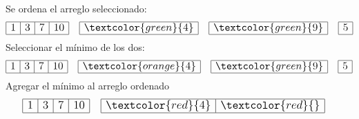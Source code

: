 \documentclass{article}
\begin{document}
\begin{minipage}{0.5\textwidth}
  Se ordena el arreglo seleccionado:
  \begin{equation*}
    \large
    \begin{array}{|r|r|r|r|}
      \hline 1 & 3 & 7 & 10 \\ \hline
    \end{array}\quad 
    \begin{array}{|r|}
      \hline \textcolor{green}{4} \\ \hline
    \end{array} \quad
    \begin{array}{|r|}
      \hline \textcolor{green}{9} \\ \hline
    \end{array}\quad 
    \begin{array}{|r|}
      \hline 5 \\ \hline
    \end{array}
  \end{equation*}
  Seleccionar el mínimo de los dos:
  \begin{equation*}
    \large
    \begin{array}{|r|r|r|r|}
      \hline 1 & 3 & 7 & 10 \\ \hline
    \end{array}\quad 
    \begin{array}{|r|}
      \hline \textcolor{orange}{4} \\ \hline
    \end{array} \quad
    \begin{array}{|r|}
      \hline \textcolor{green}{9} \\ \hline
    \end{array}\quad 
    \begin{array}{|r|}
      \hline 5 \\ \hline
    \end{array}
  \end{equation*}
  Agregar el mínimo al arreglo ordenado
  \begin{equation*}
    \large
    \begin{array}{|r|r|r|r|}
      \hline 1 & 3 & 7 & 10 \\ \hline
    \end{array}\quad 
    \begin{array}{|r|r|}
      \hline \textcolor{red}{4} & \textcolor{red}{} \\ \hline
    \end{array} \quad
    \begin{array}{|r|}

\end{array}
\end{equation*}
\end{minipage}
\end{document}
